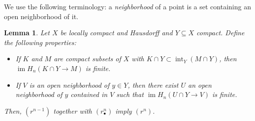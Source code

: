 \documentclass{amsart}
\newtheorem{lemma}[theorem]{Lemma}
\DeclareMathOperator{\im}{im}
\DeclareMathOperator{\interior}{int}
\begin{document}
	
	We use the following terminology: a \textit{neighborhood} of a point is a set containing an open neighborhood of it.
	
	\begin{lemma} \label{l: wilder}
		Let $X$ be locally compact and Hausdorff and $Y \subseteq X$ compact. Define the following properties:
		\begin{itemize}
			\item[$(r^n)$] If $K$ and $M$ are compact subsets of $X$ with $K \cap Y \subset \interior_Y(M \cap Y)$, then $\im H_n\left(K \cap Y \to M\right)$ is finite.
			\item[$(r^n_\bullet)$] If $V$ is an open neighborhood of $y \in Y$, then there exist $U$ an open neighborhood of $y$ contained in $V$ such that $\im H_n\left(U \cap Y \to V\right)$ is finite.
		\end{itemize}
		Then, $(r^{n-1})$ together with $(r^n_\bullet)$ imply $(r^n)$.
	\end{lemma}
	
\end{document}
